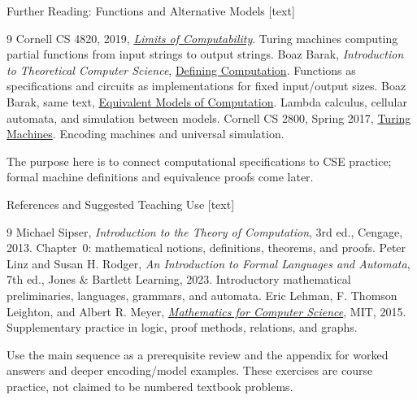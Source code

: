 \documentclass[10pt]{beamer}
\begin{document}
\begin{frame}{Further Reading: Functions and Alternative Models}
  \footnotesize
  [text]
  \begin{thebibliography}{9}
      Cornell CS 4820, 2019,
      \href{https://www.cs.cornell.edu/courses/cs4820/2019sp/handouts/computability.pdf}
      {\emph{Limits of Computability}}. Turing machines computing partial
      functions from input strings to output strings.
      Boaz Barak, \emph{Introduction to Theoretical Computer Science},
      \href{https://introtcs.org/public/lec_03_computation.html}
      {Defining Computation}. Functions as specifications and circuits
      as implementations for fixed input/output sizes.
      Boaz Barak, same text,
      \href{https://introtcs.org/public/lec_07_other_models.html}
      {Equivalent Models of Computation}. Lambda calculus, cellular
      automata, and simulation between models.
      Cornell CS 2800, Spring 2017,
      \href{https://www.cs.cornell.edu/courses/cs2800/2017sp/lectures/lec28-turing.html}
      {Turing Machines}. Encoding machines and universal simulation.
  \end{thebibliography}
  The purpose here is to connect computational specifications to CSE
  practice; formal machine definitions and equivalence proofs come later.
\end{frame}

\begin{frame}{References and Suggested Teaching Use}
  \small
  [text]
  \begin{thebibliography}{9}
      Michael Sipser, \emph{Introduction to the Theory of Computation},
      3rd ed., Cengage, 2013. Chapter~0: mathematical notions,
      definitions, theorems, and proofs.
      Peter Linz and Susan H. Rodger,
      \emph{An Introduction to Formal Languages and Automata}, 7th ed.,
      Jones \& Bartlett Learning, 2023. Introductory mathematical
      preliminaries, languages, grammars, and automata.
      Eric Lehman, F. Thomson Leighton, and Albert R. Meyer,
      \href{https://ocw.mit.edu/courses/6-042j-mathematics-for-computer-science-spring-2015/mit6_042js15_textbook.pdf}
      {\emph{Mathematics for Computer Science}}, MIT, 2015.
      Supplementary practice in logic, proof methods, relations, and graphs.
  \end{thebibliography}
  Use the main sequence as a prerequisite review and the appendix for
  worked answers and deeper encoding/model examples. These exercises
  are course practice, not claimed to be numbered textbook problems.
\end{frame}
\end{document}
